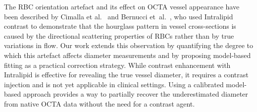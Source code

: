 The RBC orientation artefact and its effect on OCTA vessel appearance have been described by Cimalla et al.~\cite{cimallaShearFlowinducedOptical2011} and Bernucci et~al.~\cite{bernucciInvestigationArtifactsRetinal2018}, who used Intralipid contrast to demonstrate that the hourglass pattern in vessel cross-sections is caused by the directional scattering properties of RBCs rather than by true variations in flow. Our work extends this observation by quantifying the degree to which this artefact affects diameter measurements and by proposing model-based fitting as a practical correction strategy. While contrast enhancement with Intralipid is effective for revealing the true vessel diameter, it requires a contrast injection and is not yet applicable in clinical settings. Using a calibrated model-based approach provides a way to partially recover the underestimated diameter from native OCTA data without the need for a contrast agent. 

